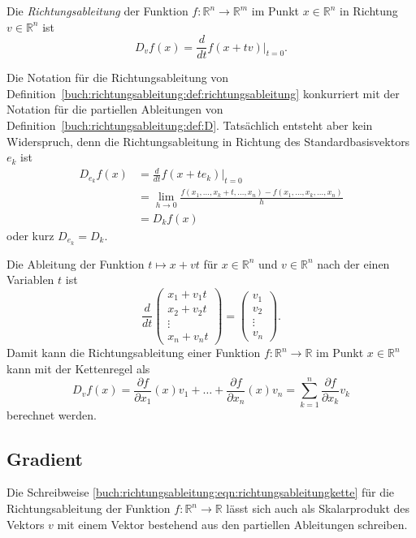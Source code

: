 \begin{definition}
\label{buch:richtungsableitung:def:richtungsableitung}
Die {\em Richtungsableitung} der Funktion $f\colon\mathbb{R}^n\to\mathbb{R}^m$
%
im Punkt $x\in\mathbb{R}^n$ in Richtung $v\in\mathbb{R}^n$ ist 
\[
D_vf(x)
=
\frac{d}{dt}f(x+tv)\bigg|_{t=0}.
\]
\end{definition}

Die Notation für die Richtungsableitung von
Definition~\ref{buch:richtungsableitung:def:richtungsableitung}
konkurriert mit der Notation für die partiellen Ableitungen von
Definition~\ref{buch:richtungsableitung:def:D}.
Tatsächlich entsteht aber kein Widerspruch, denn die 
Richtungsableitung in Richtung des Standardbasisvektors $e_k$ ist
\begin{align*}
D_{e_k}f(x)
&=
\frac{d}{dt} f(x+te_k)\bigg|_{t=0}
\\
&=
\lim_{h\to 0}
\frac{f(x_1,\dots,x_k+t,\dots,x_n)-f(x_1,\dots,x_k,\dots,x_n)}{h}
\\
&=
D_kf(x)
\end{align*}
oder kurz $D_{e_k}=D_k$.

Die Ableitung der Funktion $t\mapsto x+vt$ für $x\in\mathbb{R}^n$
und $v\in\mathbb{R}^n$ nach der einen Variablen $t$ ist
\[
\frac{d}{dt}
\begin{pmatrix}
x_1+v_1t\\
x_2+v_2t\\
\vdots  \\
x_n+v_nt
\end{pmatrix}
=
\begin{pmatrix}
v_1\\
v_2\\
\vdots\\
v_n
\end{pmatrix}.
\]
Damit kann die Richtungsableitung einer Funktion
$f\colon\mathbb{R}^n\to\mathbb{R}$
im Punkt $x\in\mathbb{R}^n$ kann mit der Kettenregel als
\begin{equation}
D_vf(x)
=
\frac{\partial f}{\partial x_1}(x) v_1
+
\dots
+
\frac{\partial f}{\partial x_n}(x) v_n
=
\sum_{k=1}^n \frac{\partial f}{\partial x_k} v_k
\label{buch:richtungsableitung:eqn:richtungsableitungkette}
\end{equation}
berechnet werden.

%
%
\subsection{Gradient}
Die Schreibweise
\eqref{buch:richtungsableitung:eqn:richtungsableitungkette}
für die Richtungsableitung der Funktion $f\colon\mathbb{R}^n\to\mathbb{R}$
lässt sich auch als Skalarprodukt des Vektors $v$ mit einem Vektor
bestehend aus den partiellen Ableitungen schreiben.

